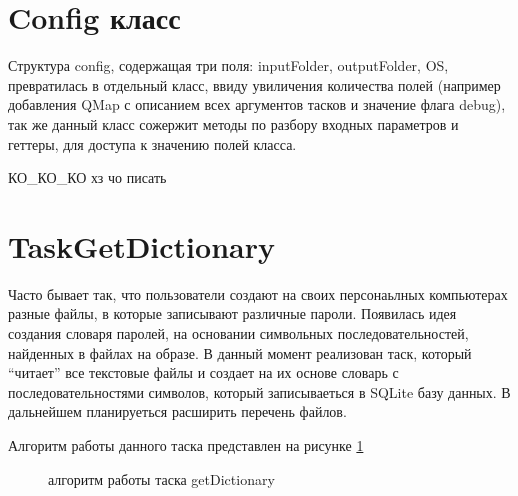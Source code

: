 \section{Config класс}

Структура config, содержащая три поля: inputFolder, outputFolder, OS, превратилась в отдельный класс, ввиду увиличения количества полей (например добавления QMap с описанием всех аргументов тасков и значение флага debug), так же данный класс сожержит методы по разбору входных параметров и геттеры, для доступа к значению полей класса. 

КО\_КО\_КО хз чо писать %

\section{TaskGetDictionary}

Часто бывает так, что пользователи создают на своих персонаьлных компьютерах разные файлы, в которые записывают различные пароли. Появилась идея создания словаря паролей, на основании символьных последовательностей, найденных в файлах на образе. В данный момент реализован таск, который ``читает'' все текстовые файлы и создает на их основе словарь с последовательностями символов, который записываеться в SQLite базу данных. В дальнейшем планируеться расширить перечень файлов.

Алгоритм работы данного таска представлен на рисунке \ref{png:TaskGetDictionary}

\newpage
\begin{figure}[h]
 \caption{алгоритм работы таска getDictionary}
 \label{png:TaskGetDictionary}
\end{figure}
